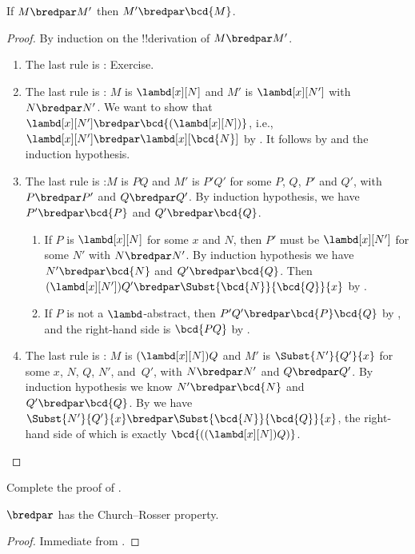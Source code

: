 \documentclass[../../../include/open-logic-section]{subfiles}
\begin{document}
\begin{lem}
  If $M \bredpar M'$ then $M' \bredpar \bcd{M}$.
\end{lem}
\begin{proof}
  By induction on the !!{derivation} of $M \bredpar M'$.
  \begin{enumerate}
    \item The last rule is : Exercise.
    \item The last rule is : $M$ is 
      $\lambd[x][N]$ and $M'$ is $\lambd[x][N']$ with
      $N \bredpar N'$. We want to show that $\lambd[x][N'] \bredpar
      \bcd{(\lambd[x][N])}$, i.e., $\lambd[x][N'] \bredpar
      \lambd[x][\bcd{N}]$ by . It follows by
       and the induction hypothesis.
    \item The last rule is :$M$ is $PQ$ and $M'$
      is $P'Q'$ for some $P$, $Q$, $P'$ and $Q'$, with $P \bredpar P'$
      and $Q \bredpar Q'$. By induction hypothesis, we have $P'
      \bredpar \bcd{P}$ and $Q' \bredpar \bcd{Q}$.
      \begin{enumerate}
        \item If $P$ is $\lambd[x][N]$ for some $x$ and $N$, then
          $P'$ must be $\lambd[x][N']$ for some $N'$ with 
          $N \bredpar N'$. By induction hypothesis we have $N' \bredpar \bcd{N}$ and
          $Q' \bredpar \bcd{Q}$. Then $(\lambd[x][N'])Q' \bredpar
          \Subst{\bcd{N}}{\bcd{Q}}{x}$ by .
        \item If $P$ is not a $\lambd$-abstract, then $P'Q' \bredpar
          \bcd{P}\bcd{Q}$ by , and the right-hand
          side is $\bcd{PQ}$ by .
      \end{enumerate}
    \item The last rule is : $M$ is
      $(\lambd[x][N])Q$  and $M'$ is $\Subst{N'}{Q'}{x}$ for some $x$,
      $N$, $Q$, $N'$, and~$Q'$, with $N \bredpar N'$ and $Q \bredpar
      Q'$. By induction hypothesis we know $N' \bredpar \bcd{N}$ and
      $Q' \bredpar \bcd{Q}$. By  we have
      $\Subst{N'}{Q'}{x} \bredpar \Subst{\bcd{N}}{\bcd{Q}}{x}$, the
      right-hand side of which is exactly $\bcd{((\lambd[x][N])Q)}$.
  \end{enumerate}
\end{proof}

\begin{prob}
  Complete the proof of .
\end{prob}

\begin{thm}
  $\bredpar$ has the Church--Rosser property.
\end{thm}

\begin{proof}
  Immediate from .
\end{proof}
\end{document}

